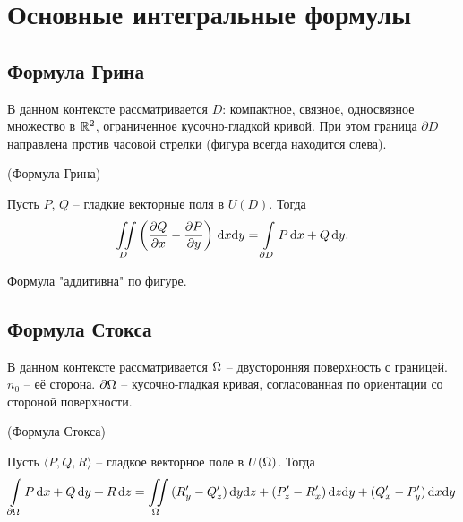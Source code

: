 \chapter{Основные интегральные формулы}
\section{Формула Грина}

\begin{remark}
     В данном контексте рассматривается $D$: компактное, связное,
     односвязное множество в $\mathbb{R}^2$, ограниченное кусочно-гладкой кривой.
     При этом граница $\partial D$ направлена против часовой стрелки 
     (фигура всегда находится слева).
\end{remark}

\begin{theorem}(Формула Грина)

    Пусть $P$, $Q$ -- гладкие векторные поля в $U(D)$. Тогда
\[
    \iint\limits_{D}{\left( \dfrac{\partial Q}{\partial x} - \dfrac{\partial P}{\partial y} \right) \,\mathrm{d} x \mathrm{d} y}
    = \int\limits_{\partial D}{P \,\mathrm{d} x + Q \,\mathrm{d} y}
.\] 
\end{theorem}

\begin{remark}
    Формула "аддитивна" по фигуре.
\end{remark}

\section{Формула Стокса}

\begin{remark}
    В данном контексте рассматривается $\Omega$ -- двусторонняя поверхность с границей.
    $n_0$ -- её сторона. $\partial \Omega$ -- кусочно-гладкая кривая, согласованная
    по ориентации со стороной поверхности.
\end{remark}

\begin{theorem}(Формула Стокса)

    Пусть $\langle P, Q, R \rangle$ -- гладкое векторное поле в $U(\Omega)$. Тогда
    \begin{align*}
        \int\limits_{\partial \Omega}{P \,\mathrm{d} x + Q \,\mathrm{d} y + R \,\mathrm{d} z} =
        \iint\limits_{\Omega}{(R'_y - Q'_z) \,\mathrm{d} y \mathrm{d} z + (P'_z - R'_x) \,\mathrm{d} z \mathrm{d} y + (Q'_x - P'_y) \,\mathrm{d} x \mathrm{d} y}
    \end{align*}
\end{theorem}

